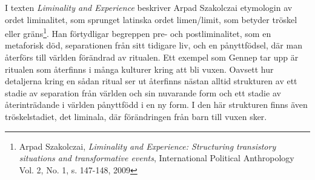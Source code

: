 \documentclass{article}
\begin{document}
I texten \emph{Liminality and Experience} beskriver Arpad Szakolczai etymologin av ordet liminalitet, som
sprunget latinska ordet limen/limit, som betyder tröskel eller gräns\footnote{Arpad Szakolczai,
\emph{Liminality and Experience: Structuring transistory situations and transformative events}, International
Political Anthropology Vol. 2, No. 1, s. 147-148, 2009}. Han förtydligar begreppen pre- och postliminalitet,
som en metaforisk död, separationen från sitt tidigare liv, och en pånyttfödsel, där man återförs till världen
förändrad av ritualen. Ett exempel som Gennep tar upp är ritualen som återfinns i många kulturer kring att bli
vuxen. Oavsett hur detaljerna kring en sådan ritual ser ut återfinns nästan alltid strukturen av ett stadie av
separation från världen och sin nuvarande form och ett stadie av återinträdande i världen pånyttfödd i en ny
form. I den här strukturen finns även tröskelstadiet, det liminala, där förändringen från barn till vuxen
sker. 














\end{document}
